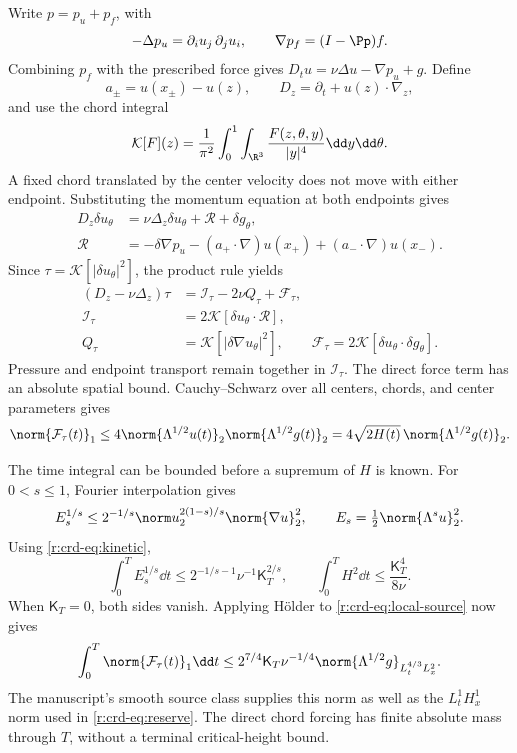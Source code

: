 Write \(p=p_u+p_f\), with
\[
 -\Delta p_u=\partial_i u_j\,\partial_j u_i,\qquad
 \nabla p_f=(I-\Pp)f.
\]
Combining \(p_f\) with the prescribed force gives
\(D_tu=\nu\Delta u-\nabla p_u+g\). Define
\[
 a_\pm=u(x_\pm)-u(z),\qquad
 D_z=\partial_t+u(z)\cdot\nabla_z,
\]
and use the chord integral
\[
 \mathcal K[F](z)=\frac1{\pi^2}\int_0^1\int_{\R^3}
             \frac{F(z,\theta,y)}{|y|^4}\dd y\dd\theta.
\]
A fixed chord translated by the center velocity does not move with either
endpoint. Substituting the momentum equation at both endpoints gives
\begin{equation}
 \begin{aligned}
 D_z\delta u_\theta&=\nu\Delta_z\delta u_\theta
                  +\mathcal R+\delta g_\theta,\\
 \mathcal R&=-\delta\nabla p_u
 -(a_+\cdot\nabla)u(x_+)+(a_-\cdot\nabla)u(x_-).
 \end{aligned}
 \label{r:crd-eq:chord-momentum}
\end{equation}
Since \(\tau=\mathcal K[|\delta u_\theta|^2]\), the product rule yields
\begin{equation}
 \begin{aligned}
 (D_z-\nu\Delta_z)\tau
   &=\mathcal I_\tau-2\nu Q_\tau+\mathcal F_\tau,\\
 \mathcal I_\tau&=2\mathcal K[\delta u_\theta\cdot\mathcal R],\\
 Q_\tau&=\mathcal K[|\delta\nabla u_\theta|^2],\qquad
 \mathcal F_\tau=2\mathcal K[\delta u_\theta\cdot\delta g_\theta].
 \end{aligned}
 \label{r:crd-eq:density}
\end{equation}
Pressure and endpoint transport remain together in \(\mathcal I_\tau\).
The direct force term has an absolute spatial bound. Cauchy--Schwarz
over all centers, chords, and center parameters gives
\begin{equation}
 \norm{\mathcal F_\tau(t)}_1
 \le4\norm{\Lambda^{1/2}u(t)}_2\norm{\Lambda^{1/2}g(t)}_2
 =4\sqrt{2H(t)}\,\norm{\Lambda^{1/2}g(t)}_2.
 \label{r:crd-eq:local-source}
\end{equation}

The time integral can be bounded before a supremum of \(H\) is known.
For \(0<s\le1\), Fourier interpolation gives
\[
 E_s^{1/s}\le
 2^{-1/s}\norm u_2^{2(1-s)/s}\norm{\nabla u}_2^2,
 \qquad E_s=\tfrac12\norm{\Lambda^su}_2^2.
\]
Using \eqref{r:crd-eq:kinetic},
\begin{equation}
 \int_0^T E_s^{1/s}\dd t
 \le2^{-1/s-1}\nu^{-1}\mathsf K_T^{2/s},\qquad
 \int_0^T H^2\dd t\le\frac{\mathsf K_T^4}{8\nu}.
 \label{r:crd-eq:low-height}
\end{equation}
When \(\mathsf K_T=0\), both sides vanish. Applying H\"older to
\eqref{r:crd-eq:local-source} now gives
\begin{equation}
 \int_0^T\norm{\mathcal F_\tau(t)}_1\dd t
 \le2^{7/4}\mathsf K_T\nu^{-1/4}
       \norm{\Lambda^{1/2}g}_{L^{4/3}_tL^2_x}.
 \label{r:crd-eq:local-source-budget}
\end{equation}
The manuscript's smooth source class supplies this norm as well as the
\(L^1_tH^1_x\) norm used in \eqref{r:crd-eq:reserve}.
The direct chord forcing has finite absolute mass through \(T\), without
a terminal critical-height bound.

